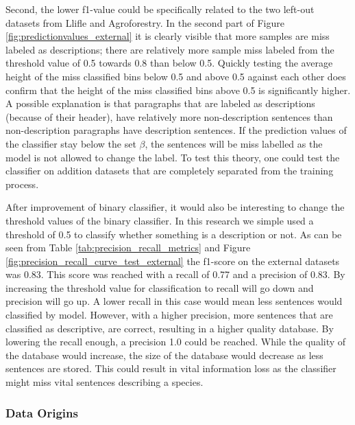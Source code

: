 \documentclass[a4paper, 12pt, oneside]{book} %
\begin{document}
Second, the lower f1-value could be specifically related to the two left-out datasets from Llifle and Agroforestry.
In the second part of Figure \ref{fig:predictionvalues_external} it is clearly visible that more samples are miss labeled as descriptions; there are relatively more sample miss labeled from the threshold value of 0.5 towards 0.8 than below 0.5.
Quickly testing the average height of the miss classified bins below 0.5 and above 0.5 against each other does confirm that the height of the miss classified bins above 0.5 is significantly higher.
A possible explanation is that paragraphs that are labeled as descriptions (because of their header), have relatively more non-description sentences than non-description paragraphs have description sentences.
If the prediction values of the classifier stay below the set \(\beta\), the sentences will be miss labelled as the model is not allowed to change the label.
To test this theory, one could test the classifier on addition datasets that are completely separated from the training process.

After improvement of binary classifier, it would also be interesting to change the threshold values of the binary classifier.
In this research we simple used a threshold of 0.5 to classify whether something is a description or not.
As can be seen from Table \ref{tab:precision_recall_metrics} and Figure \ref{fig:precision_recall_curve_test_external} the f1-score on the external datasets was 0.83. 
This score was reached with a recall of 0.77 and a precision of 0.83.
By increasing the threshold value for classification to recall will go down and precision will go up.
A lower recall in this case would mean less sentences would classified by model.
However, with a higher precision, more sentences that are classified as descriptive, are correct, resulting in a higher quality database.
By lowering the recall enough, a precision 1.0 could be reached.
While the quality of the database would increase, the size of the database would decrease as less sentences are stored.
This could result in vital information loss as the classifier might miss vital sentences describing a species.

\subsubsection{Data Origins}
\end{document}
